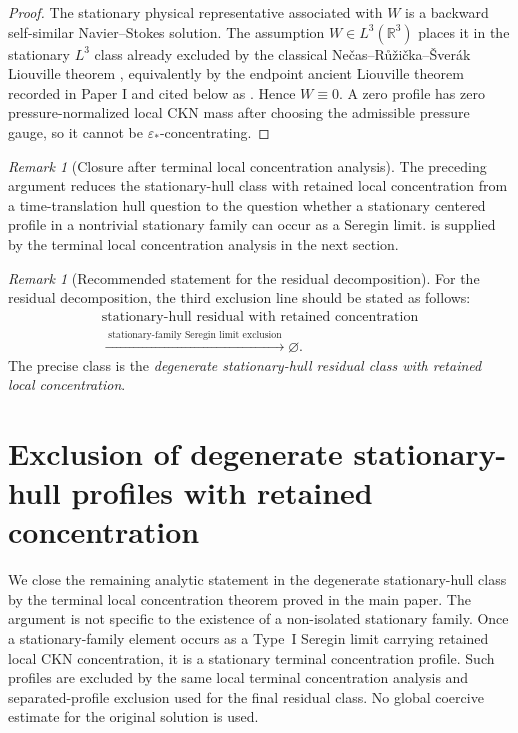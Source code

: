 \documentclass[11pt]{amsart}
\numberwithin{equation}{section}
\theoremstyle{plain}
\theoremstyle{definition}
\theoremstyle{remark}
\newtheorem{remark}[theorem]{Remark}
\begin{document}
\begin{proof}
The stationary physical representative associated with \(W\) is a backward
self-similar Navier--Stokes solution.  The assumption \(W\in L^3(\mathbb R^3)\)
places it in the stationary \(L^3\) class already excluded by the classical
Ne\v cas--R\r u\v zi\v cka--\v Sver\'ak Liouville theorem \cite{NRS1996},
equivalently by the endpoint ancient Liouville theorem recorded in Paper I and
cited below as .  Hence \(W\equiv0\).  A
zero profile has zero pressure-normalized local CKN mass after choosing the
admissible pressure gauge, so it cannot be \(\varepsilon_*\)-concentrating.
\end{proof}

\begin{remark}[Closure after terminal local concentration analysis]
\label{rem:R3-final-obligation}
The preceding argument reduces the stationary-hull class with retained local
concentration from a time-translation hull question to the question whether a
stationary centered profile in a nontrivial stationary family can occur as a
Seregin limit.
 is supplied by the terminal local
concentration analysis in the next section.
\end{remark}

\begin{remark}[Recommended statement for the residual decomposition]
\label{rem:R3-decomposition-replacement}
For the residual decomposition, the third exclusion line should be stated as follows:
\[
\begin{gathered}
   \text{stationary-hull residual with retained concentration}\\
   \xrightarrow{\;\text{stationary-family Seregin limit exclusion}\;}
   \varnothing .
\end{gathered}
\]
The precise class is the
\emph{degenerate stationary-hull residual class with retained local
concentration}.
\end{remark}


\section{Exclusion of degenerate stationary-hull profiles with retained concentration}
\label{sec:R3-terminal-stratification-closure}

We close the remaining analytic statement in the degenerate stationary-hull
class by the terminal local concentration theorem proved in the main
paper.  The argument is not specific to the existence of a
non-isolated stationary family.  Once a stationary-family element occurs as
a Type~I Seregin limit carrying retained local CKN concentration, it is a
stationary terminal concentration profile.  Such profiles are excluded by the
same local terminal concentration analysis and separated-profile exclusion used
for the final residual class.  No global coercive
estimate for the original solution is used.
\end{document}
